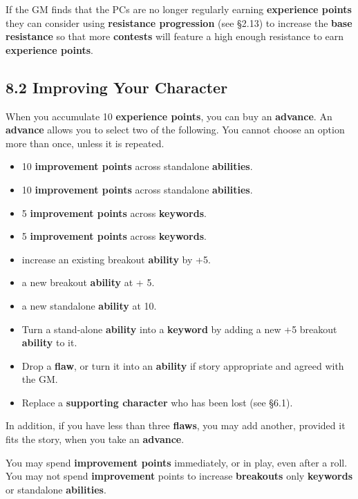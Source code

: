\documentclass[
  11pt,
]{article}
\providecommand{\tightlist}{%
  \setlength{\itemsep}{0pt}\setlength{\parskip}{0pt}}
\begin{document}
If the GM finds that the PCs are no longer regularly earning
\textbf{experience points} they can consider using \textbf{resistance
progression} (see §2.13) to increase the \textbf{base resistance} so
that more \textbf{contests} will feature a high enough resistance to
earn \textbf{experience points}.

\hypertarget{improving-your-character}{%
\subsection{8.2 Improving Your
Character}\label{improving-your-character}}

When you accumulate 10 \textbf{experience points}, you can buy an
\textbf{advance}. An \textbf{advance} allows you to select two of the
following. You cannot choose an option more than once, unless it is
repeated.

\begin{itemize}
\tightlist
\item
  10 \textbf{improvement points} across standalone \textbf{abilities}.
\item
  10 \textbf{improvement points} across standalone \textbf{abilities}.
\item
  5 \textbf{improvement points} across \textbf{keywords}.
\item
  5 \textbf{improvement points} across \textbf{keywords}.
\item
  increase an existing breakout \textbf{ability} by +5.
\item
  a new breakout \textbf{ability} at + 5.
\item
  a new standalone \textbf{ability} at 10.
\item
  Turn a stand-alone \textbf{ability} into a \textbf{keyword} by adding
  a new +5 breakout \textbf{ability} to it.
\item
  Drop a \textbf{flaw}, or turn it into an \textbf{ability} if story
  appropriate and agreed with the GM.
\item
  Replace a \textbf{supporting character} who has been lost (see §6.1).
\end{itemize}

In addition, if you have less than three \textbf{flaws}, you may add
another, provided it fits the story, when you take an \textbf{advance}.

You may spend \textbf{improvement points} immediately, or in play, even
after a roll. You may not spend \textbf{improvement} points to increase
\textbf{breakouts} only \textbf{keywords} or standalone
\textbf{abilities}.
\end{document}
